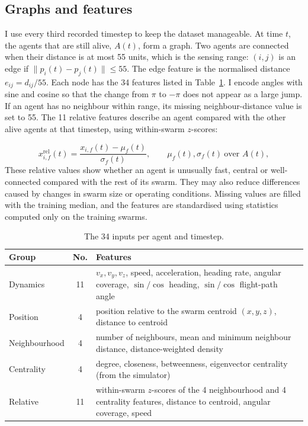 \documentclass[11pt,a4paper]{article}
\begin{document}
\subsection{Graphs and features}
I use every third recorded timestep to keep the dataset manageable. At time $t$, the agents that are still alive,
$A(t)$, form a graph. Two agents are connected when their distance is at most 55 units, which is the sensing range:
$(i,j)$ is an edge if $\lVert p_i(t)-p_j(t)\rVert\le55$. The edge feature is the normalised distance
$e_{ij}=d_{ij}/55$. Each node has the 34 features listed in Table~\ref{tab:features}. I encode angles with sine
and cosine so that the change from $\pi$ to $-\pi$ does not appear as a large jump. If an agent has no neighbour
within range, its missing neighbour-distance value is set to 55. The 11 relative features describe an agent
compared with the other alive agents at that timestep, using within-swarm $z$-scores:

\begin{equation}
x^{\mathrm{rel}}_{i,f}(t)=\frac{x_{i,f}(t)-\mu_f(t)}{\sigma_f(t)},\qquad \mu_f(t),\sigma_f(t)\ \text{over } A(t),
\end{equation}
These relative values show whether an agent is unusually fast, central or well-connected compared with the rest of
its swarm. They may also reduce differences caused by changes in swarm size or operating conditions. Missing values
are filled with the training median, and the features are standardised using statistics computed only on the training swarms.

\begin{table}[!htbp]\centering\small
\caption{The 34 inputs per agent and timestep.}\label{tab:features}
\begin{tabular}{@{}lcp{10.9cm}@{}}\toprule
Group & No. & Features\\\midrule
Dynamics & 11 & $v_x,v_y,v_z$, speed, acceleration, heading rate, angular coverage, $\sin/\cos$ heading, $\sin/\cos$ flight-path angle\\
Position & 4 & position relative to the swarm centroid $(x,y,z)$, distance to centroid\\
Neighbourhood & 4 & number of neighbours, mean and minimum neighbour distance, distance-weighted density\\
Centrality & 4 & degree, closeness, betweenness, eigenvector centrality (from the simulator)\\
Relative & 11 & within-swarm $z$-scores of the 4 neighbourhood and 4 centrality features, distance to centroid, angular coverage, speed\\\bottomrule
\end{tabular}
\end{table}
\end{document}
